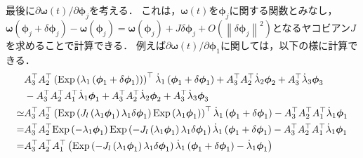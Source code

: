 最後に$\partial \boldsymbol \omega(t) / \partial \boldsymbol \phi_{j}$を考える．
これは，$\boldsymbol \omega(t)$を$\boldsymbol \phi_{j}$に関する関数とみなし，$\boldsymbol \omega \left( \boldsymbol \phi_{j} + \delta \boldsymbol \phi_{j} \right) - \boldsymbol \omega \left( \boldsymbol \phi_{j} \right) = \boldsymbol \omega \left( \boldsymbol \phi_{j} \right) + J \delta \boldsymbol \phi_{j} + O \left( \left\| \delta \boldsymbol \phi_{j} \right\|^{2} \right)$となるヤコビアン$J$を求めることで計算できる．
例えば$\partial \boldsymbol \omega(t) / \partial \boldsymbol \phi_{1}$に関しては，以下の様に計算できる．
%
\begin{align}
  \begin{split}
    & A_{3}^{\top} A_{2}^{\top} \left( {\rm Exp} \left( \lambda_{1} \left( \boldsymbol \phi_{1} + \delta \boldsymbol \phi_{1} \right) \right) \right)^{\top} \dot{ \lambda }_{1} \left( \boldsymbol \phi_{1} + \delta \boldsymbol \phi_{1} \right) + A_{3}^{\top} A_{2}^{\top} \dot{ \lambda }_{2} \boldsymbol \phi_{2} + A_{3}^{\top} \dot{ \lambda }_{3} \boldsymbol \phi_{3} \\
    & - A_{3}^{\top} A_{2}^{\top} A_{1}^{\top} \dot{ \lambda }_{1} \boldsymbol \phi_{1} + A_{3}^{\top} A_{2}^{\top} \dot{ \lambda }_{2} \boldsymbol \phi_{2} + A_{3}^{\top} \dot{ \lambda }_{3} \boldsymbol \phi_{3} \\
    \simeq & A_{3}^{\top} A_{2}^{\top} \left( {\rm Exp} \left( J_{l} \left( \lambda_{1} \boldsymbol \phi_{1} \right) \lambda_{1} \delta \boldsymbol \phi_{1} \right) {\rm Exp} \left( \lambda_{1} \boldsymbol \phi_{1} \right) \right)^{\top} \dot{ \lambda }_{1} \left( \boldsymbol \phi_{1} + \delta \boldsymbol \phi_{1} \right)
    - A_{3}^{\top} A_{2}^{\top} A_{1}^{\top} \dot{ \lambda }_{1} \boldsymbol \phi_{1} \\
    = & A_{3}^{\top} A_{2}^{\top} {\rm Exp} \left( -\lambda_{1} \boldsymbol \phi_{1} \right) {\rm Exp} \left( -J_{l} \left( \lambda_{1} \boldsymbol \phi_{1} \right) \lambda_{1} \delta \boldsymbol \phi_{1} \right) \dot{ \lambda }_{1} \left( \boldsymbol \phi_{1} + \delta \boldsymbol \phi_{1} \right)
    - A_{3}^{\top} A_{2}^{\top} A_{1}^{\top} \dot{ \lambda }_{1} \boldsymbol \phi_{1} \\
    = & A_{3}^{\top} A_{2}^{\top} A_{1}^{\top} \left( {\rm Exp} \left( -J_{l} \left( \lambda_{1} \boldsymbol \phi_{1} \right) \lambda_{1} \delta \boldsymbol \phi_{1} \right) \dot{ \lambda }_{1} \left( \boldsymbol \phi_{1} + \delta \boldsymbol \phi_{1} \right) - \dot{ \lambda }_{1} \boldsymbol \phi_{1} \right) \\

\end{split}
\end{align}
